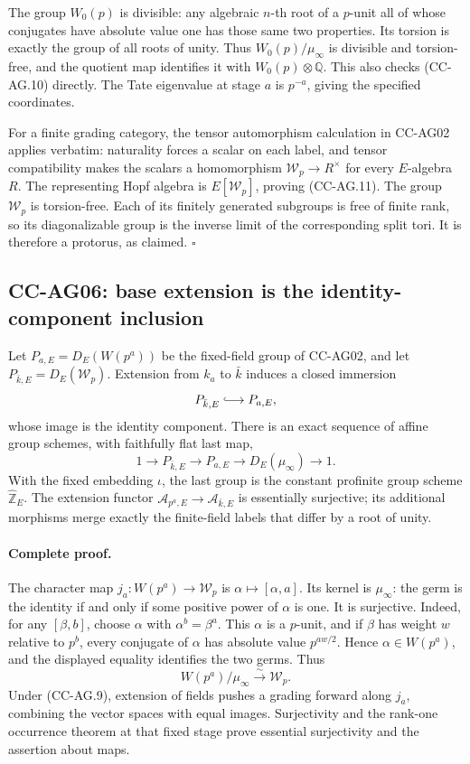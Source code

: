 The group \(W_0(p)\) is divisible: any algebraic \(n\)-th root
of a \(p\)-unit all of whose conjugates have absolute value one
has those same two properties. Its torsion is exactly the group
of all roots of unity. Thus \(W_0(p)/\mu_\infty\) is divisible
and torsion-free, and the quotient map identifies it with
\(W_0(p)\otimes\mathbb Q\). This also checks (CC-AG.10) directly.
The Tate eigenvalue at stage \(a\) is \(p^{-a}\), giving the
specified coordinates.

For a finite grading category, the tensor automorphism calculation
in CC-AG02 applies verbatim: naturality forces a scalar on each
label, and tensor compatibility makes the scalars a homomorphism
\(\mathcal W_p\to R^\times\) for every \(E\)-algebra \(R\).
The representing Hopf algebra is \(E[\mathcal W_p]\), proving
(CC-AG.11). The group \(\mathcal W_p\) is torsion-free. Each of
its finitely generated subgroups is free of finite rank, so its
diagonalizable group is the inverse limit of the corresponding
split tori. It is therefore a protorus, as claimed. \(\square\)

\subsection{CC-AG06: base extension is the identity-component inclusion}

Let \(P_{a,E}=D_E(W(p^a))\) be the fixed-field group of CC-AG02,
and let \(P_{\bar k,E}=D_E(\mathcal W_p)\). Extension from \(k_a\)
to \(\bar k\) induces a closed immersion
\[
 P_{\bar k,E}\lhook\joinrel\longrightarrow P_{a,E},
\]
whose image is the identity component. There is an exact sequence
of affine group schemes, with faithfully flat last map,
\[
 1\longrightarrow P_{\bar k,E}\longrightarrow P_{a,E}
 \longrightarrow D_E(\mu_\infty)\longrightarrow1. \tag{CC-AG.12}
\]
With the fixed embedding \(\iota\), the last group is the constant
profinite group scheme \(\widehat{\mathbb Z}_E\). The extension
functor \(\mathcal A_{p^a,E}\to\mathcal A_{\bar k,E}\) is
essentially surjective; its additional morphisms merge exactly the
finite-field labels that differ by a root of unity.

\paragraph{Complete proof.}
The character map \(j_a:W(p^a)\to\mathcal W_p\) is
\(\alpha\mapsto[\alpha,a]\). Its kernel is \(\mu_\infty\):
the germ is the identity if and only if some positive power of
\(\alpha\) is one. It is surjective. Indeed, for any
\([\beta,b]\), choose \(\alpha\) with
\(\alpha^b=\beta^a\). This \(\alpha\) is a \(p\)-unit, and if
\(\beta\) has weight \(w\) relative to \(p^b\), every conjugate
of \(\alpha\) has absolute value \(p^{aw/2}\). Hence
\(\alpha\in W(p^a)\), and the displayed equality identifies
the two germs. Thus
\[
 W(p^a)/\mu_\infty\xrightarrow{\sim}\mathcal W_p. \tag{CC-AG.13}
\]
Under (CC-AG.9), extension of fields pushes a grading forward
along \(j_a\), combining the vector spaces with equal images.
Surjectivity and the rank-one occurrence theorem at that fixed
stage prove essential surjectivity and the assertion about maps.

